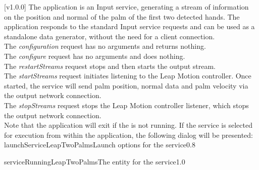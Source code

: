 [v1.0.0]
The  application is an Input service,
generating a stream of information on the position and normal of the palm of the first two
detected hands.
The application responds to the standard Input service requests and can be used as a
standalone data generator, without the need for a client connection.\\

The \emph{configuration} request has no arguments and returns nothing.\\

The \emph{configure} request has no arguments and does nothing.\\

The \emph{restartStreams} request stops and then starts the output stream.\\

The \emph{startStreams} request initiates listening to the Leap Motion controller.
Once started, the service will send palm position, normal data and palm velocity via the
output \yarp{} network connection.\\

The \emph{stopStreams} request stops the Leap Motion controller listener, which stops the
output \yarp{} network connection.\\ 

Note that the application will exit if the \emph{\RS} is not running.
\insertAppParameters
\insertTagDescription{\LTPI}
\insertInputServiceComment
\condPage
\insertStandardServiceCommands
\secondaryEnd
\condPage
{}
If the service is selected for execution from within the \emph{\MMMU} application, the
following dialog will be presented:
%
{launchServiceLeapTwoPalms}{Launch options for the \emph{\LTPI} service}{0.8}

%
{serviceRunningLeapTwoPalms}{The \emph{\MMMU} entity for the \emph{\LTPI} service}{1.0}
\secondaryEnd
\primaryEnd{}

